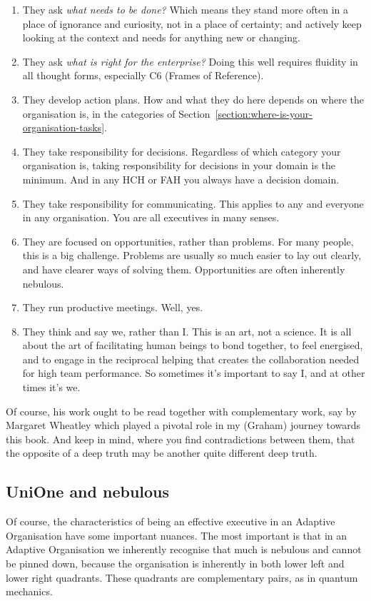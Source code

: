 \begin{enumerate}
\item  They ask \emph{what needs to be done?} Which means they stand more often in a place of ignorance and curiosity, not in a place of certainty; and actively keep looking at the context and needs for anything new or changing.
\item They ask \emph{what is right for the enterprise?} Doing this well requires fluidity in all thought forms, especially C6 (Frames of Reference).
\item They develop action plans. How and what they do here depends on where the organisation is, in the categories of Section~\ref{section:where-is-your-organisation-tasks}.
\item They take responsibility for decisions. Regardless of which category your organisation is, taking responsibility for decisions in your domain is the minimum. And in any HCH or FAH you always have a decision domain.
\item They take responsibility for communicating. This applies to any and everyone in any organisation. You are all executives in many senses.
\item They are focused on opportunities, rather than problems. For many people, this is a big challenge. Problems are usually so much easier to lay out clearly, and have clearer ways of solving them. Opportunities are often inherently nebulous.
\item They run productive meetings. Well, yes.
\item They think and say we, rather than I. This is an art, not a science. It is all about the art of facilitating human beings to bond together, to feel energised, and to engage in the reciprocal helping that creates the collaboration needed for high team performance. So sometimes it's important to say I, and at other times it's we.
\end{enumerate}


Of course, his work ought to be read together with complementary work, say by Margaret Wheatley\cite{wheatley-leadership,wheatley-lost-found} which played a pivotal role in my (Graham) journey towards this book. And keep in mind, where you find contradictions between them, that the opposite of a deep truth may be another quite different deep truth. 
\subsection{UniOne and nebulous}
Of course, the characteristics of being an effective executive in an Adaptive Organisation have some important nuances. The most important is that in an Adaptive Organisation we inherently recognise that much is nebulous and cannot be pinned down, because the organisation is inherently in both lower left and lower right quadrants. These quadrants are complementary pairs, as in quantum mechanics.


